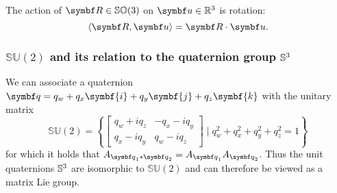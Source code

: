 The action of $\bR \in \SOthree$ on $\bu \in \mathbb{R}^3$ is rotation:
\begin{equation}
  \left \langle \bR, \bu \right \rangle = \bR \cdot \bu.
\end{equation}



\subsubsection{\texorpdfstring{$\mathbb{SU}(2)$}{SU(2)} and its relation to the quaternion group \texorpdfstring{${\mathbb{S}^3}$}{S3}}

We can associate a quaternion $\bq = q_w + q_x \symbf{i} + q_y \symbf{j} + q_z \symbf{k}$ with the unitary matrix
\begin{equation}
  \label{eq:su2_matrix}
  \mathbb{SU}(2) = \left\{ \begin{bmatrix}
    q_w + i q_z & -q_x - i q_y \\
    q_x - i q_y & q_w - i q_z
  \end{bmatrix} \mid q_w^2 + q_x^2 + q_y^2 + q_z^2 = 1 \right\}
\end{equation}
for which it holds that $A_{\bq_1 * \bq_2} = A_{\bq_1} A_{\bq_2}$. Thus the unit quaternions ${\mathbb{S}^3}$ are isomorphic to $\mathbb{SU}(2)$ and can therefore be viewed as a matrix Lie group.

